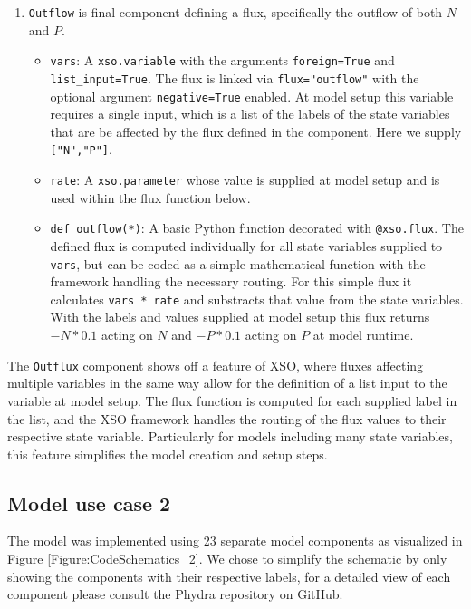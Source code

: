 \documentclass[journal abbreviation, manuscript]{copernicus}
\begin{document}
\begin{enumerate}
    \item \texttt{Outflow} is final component defining a flux, specifically the outflow of both $N$ and $P$.
        \begin{itemize}
        \item \texttt{vars}: A \texttt{xso.variable} with the arguments \texttt{foreign=True} and \texttt{list\_input=True}. The flux is linked via \texttt{flux="outflow"} with the optional argument \texttt{negative=True} enabled. At model setup this variable requires a single input, which is a list of the labels of the state variables that are be affected by the flux defined in the component. Here we supply \texttt{["N","P"]}.
        \item \texttt{rate}: A \texttt{xso.parameter} whose value is supplied at model setup and is used within the flux function below.
        \item \texttt{def outflow(*)}: A basic Python function decorated with \texttt{@xso.flux}. The defined flux is computed individually for all state variables supplied to \texttt{vars}, but can be coded as a simple mathematical function with the framework handling the necessary routing. For this simple flux it calculates \texttt{vars * rate} and substracts that value from the state variables. With the labels and values supplied at model setup this flux returns $- N * 0.1$ acting on $N$ and $-P * 0.1$ acting on $P$ at model runtime.
    \end{itemize}
\end{enumerate}

The \texttt{Outflux} component shows off a feature of XSO, where fluxes affecting multiple variables in the same way allow for the definition of a list input to the variable at model setup. The flux function is computed for each supplied label in the list, and the XSO framework handles the routing of the flux values to their respective state variable. Particularly for models including many state variables, this feature simplifies the model creation and setup steps.


\subsection{Model use case 2} \label{Appendix:Implementation2}

The model was implemented using 23 separate model components as visualized in Figure \ref{Figure:CodeSchematics_2}. We chose to simplify the schematic by only showing the components with their respective labels, for a detailed view of each component please consult the Phydra repository on GitHub.
\end{document}
